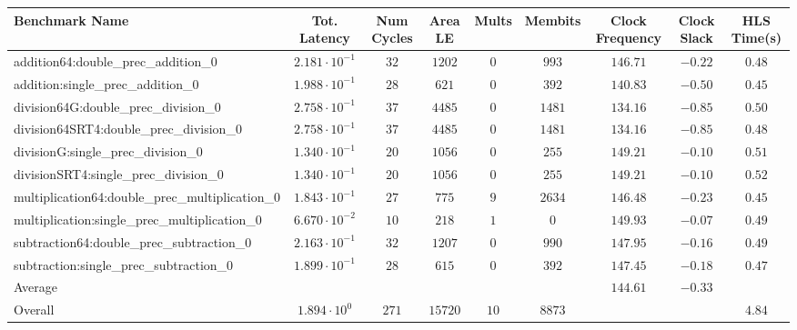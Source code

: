 \begin{tabular}{|l|c|c|c|c|c|c|c|c|}
\hline
Benchmark Name                                   & Tot. Latency            & Num Cycles & Area LE   & Mults  & Membits  & Clock Frequency & Clock Slack & HLS Time(s) \\
\hline
addition64:double\_prec\_addition\_0             & $ 2.181 \cdot 10^{-1} $ & $ 32     $ & $ 1202  $ & $ 0  $ & $ 993  $ & $ 146.71      $ & $ -0.22   $ & $ 0.48    $ \\
addition:single\_prec\_addition\_0               & $ 1.988 \cdot 10^{-1} $ & $ 28     $ & $ 621   $ & $ 0  $ & $ 392  $ & $ 140.83      $ & $ -0.50   $ & $ 0.45    $ \\
division64G:double\_prec\_division\_0            & $ 2.758 \cdot 10^{-1} $ & $ 37     $ & $ 4485  $ & $ 0  $ & $ 1481 $ & $ 134.16      $ & $ -0.85   $ & $ 0.50    $ \\
division64SRT4:double\_prec\_division\_0         & $ 2.758 \cdot 10^{-1} $ & $ 37     $ & $ 4485  $ & $ 0  $ & $ 1481 $ & $ 134.16      $ & $ -0.85   $ & $ 0.48    $ \\
divisionG:single\_prec\_division\_0              & $ 1.340 \cdot 10^{-1} $ & $ 20     $ & $ 1056  $ & $ 0  $ & $ 255  $ & $ 149.21      $ & $ -0.10   $ & $ 0.51    $ \\
divisionSRT4:single\_prec\_division\_0           & $ 1.340 \cdot 10^{-1} $ & $ 20     $ & $ 1056  $ & $ 0  $ & $ 255  $ & $ 149.21      $ & $ -0.10   $ & $ 0.52    $ \\
multiplication64:double\_prec\_multiplication\_0 & $ 1.843 \cdot 10^{-1} $ & $ 27     $ & $ 775   $ & $ 9  $ & $ 2634 $ & $ 146.48      $ & $ -0.23   $ & $ 0.45    $ \\
multiplication:single\_prec\_multiplication\_0   & $ 6.670 \cdot 10^{-2} $ & $ 10     $ & $ 218   $ & $ 1  $ & $ 0    $ & $ 149.93      $ & $ -0.07   $ & $ 0.49    $ \\
subtraction64:double\_prec\_subtraction\_0       & $ 2.163 \cdot 10^{-1} $ & $ 32     $ & $ 1207  $ & $ 0  $ & $ 990  $ & $ 147.95      $ & $ -0.16   $ & $ 0.49    $ \\
subtraction:single\_prec\_subtraction\_0         & $ 1.899 \cdot 10^{-1} $ & $ 28     $ & $ 615   $ & $ 0  $ & $ 392  $ & $ 147.45      $ & $ -0.18   $ & $ 0.47    $ \\
\hline
Average                                          & $                     $ & $        $ & $       $ & $    $ & $      $ & $ 144.61      $ & $ -0.33   $ & $         $ \\
\hline
Overall                                          & $ 1.894 \cdot 10^{0}  $ & $ 271    $ & $ 15720 $ & $ 10 $ & $ 8873 $ & $             $ & $         $ & $ 4.84    $ \\
\hline
\end{tabular}
